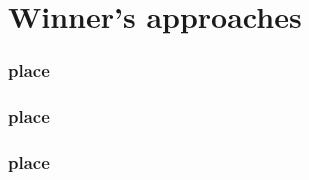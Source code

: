 \section{Winner's approaches} 
\begin{frame}\frametitle{ place}
\end{frame}
\begin{frame}\frametitle{ place}
\end{frame}
\begin{frame}\frametitle{ place}
\end{frame}
